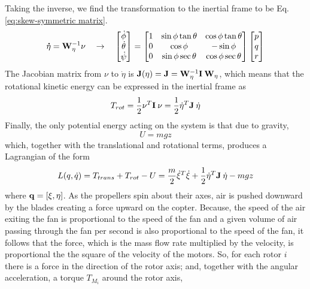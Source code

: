 \documentclass[11pt]{ucthesis}
\begin{document}
Taking the inverse, we find the transformation to the inertial frame to be Eq.\ref{eq:skew-symmetric matrix}.
\begin{equation}\label{eq:skew-symmetric matrix}
\bold{\dot{\eta}} = \bold{W}_{\eta}^{-1} \nu \quad \rightarrow \quad
\begin{bmatrix}
\dot{\phi}\\
\dot{\theta}\\
\dot{\psi}
\end{bmatrix}  = 
\begin{bmatrix}
1 & \sin\phi\tan\theta & \cos\phi\tan\theta\\
0 & \cos\phi & -\sin\phi\\
0 & \sin\phi\sec\theta & \cos\phi\sec\theta
\end{bmatrix} 
\begin{bmatrix}
p\\
q\\
r
\end{bmatrix}
\end{equation}
The Jacobian matrix from $\nu$ to $\dot{\eta}$ is $\bold{J}(\eta) = \bold{J} = \bold{W}_{\eta}^{-1}\bold{I}\:\bold{W}_{\eta}$, which means that the rotational kinetic energy can be expressed in the inertial frame as 
\begin{equation}
T_{rot} = \frac{1}{2}\nu^T\bold{I}\:\nu = \frac{1}{2}\dot{\eta}^T \bold{J\:}\dot{\eta}
\end{equation}
Finally, the only potential energy acting on the system is that due to gravity,
\begin{equation}
U = mgz
\end{equation}
which, together with the translational and rotational terms, produces a Lagrangian of the form
\begin{equation}
L(q,\dot{q}) = T_{trans}+T_{rot}-U =  \frac{m}{2}\dot{\xi}^T\dot{\xi} + \frac{1}{2}\dot{\eta}^T \bold{J\:}\dot{\eta} - mgz
\end{equation}
where $\bold{q} = [\xi, \eta]$. As the propellers spin about their axes, air is pushed downward by the blades creating a force upward on the copter. Because, the speed of the air exiting the fan is proportional to the speed of the fan and a given volume of air passing through the fan per second is also proportional to the speed of the fan, it follows that the force, which is the mass flow rate multiplied by the velocity, is proportional the the square of the velocity of the motors. So, for each rotor $i$ there is a force in the direction of the rotor axis; and, together with the angular acceleration, a torque $T_{M_i}$ around the rotor axis,
\end{document}
